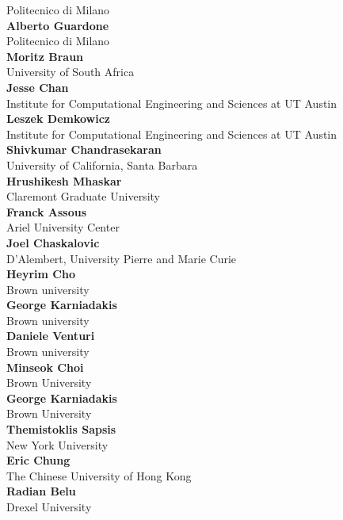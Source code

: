 \documentclass[article,A4,11pt]{llncs}%
\begin{document}
    Politecnico di Milano\\
        \noindent
    {\bf Alberto Guardone}\\
    Politecnico di Milano\\
        \noindent
    {\bf Moritz Braun}\\
    University of South Africa\\
        \noindent
    {\bf Jesse Chan}\\
    Institute for Computational Engineering and Sciences at UT Austin\\
        \noindent
    {\bf Leszek Demkowicz}\\
    Institute for Computational Engineering and Sciences at UT Austin\\
        \noindent
    {\bf Shivkumar Chandrasekaran}\\
    University of California, Santa Barbara\\
        \noindent
    {\bf Hrushikesh Mhaskar}\\
    Claremont Graduate University\\
        \noindent
    {\bf Franck Assous}\\
    Ariel University Center\\
        \noindent
    {\bf Joel Chaskalovic}\\
    D'Alembert, University Pierre and Marie Curie\\
        \noindent
    {\bf Heyrim Cho}\\
    Brown university\\
        \noindent
    {\bf George Karniadakis}\\
    Brown university\\
        \noindent
    {\bf Daniele Venturi}\\
    Brown university\\
        \noindent
    {\bf Minseok Choi}\\
    Brown University\\
        \noindent
    {\bf George Karniadakis}\\
    Brown University\\
        \noindent
    {\bf Themistoklis Sapsis}\\
    New York University\\
        \noindent
    {\bf Eric Chung}\\
    The Chinese University of Hong Kong\\
        \noindent
    {\bf Radian Belu}\\
    Drexel University\\
\end{document}
